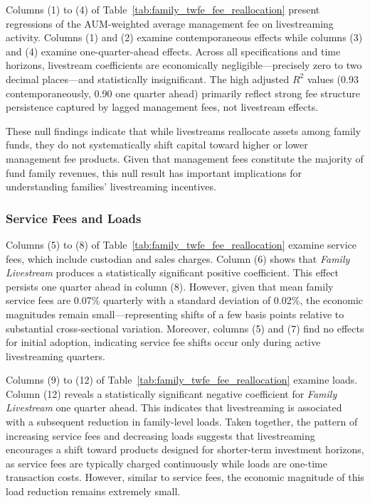 \documentclass[12pt]{article}
\begin{document}
Columns (1) to (4) of Table~\ref{tab:family_twfe_fee_reallocation} present regressions of the AUM-weighted average management fee on livestreaming activity. Columns (1) and (2) examine contemporaneous effects while columns (3) and (4) examine one-quarter-ahead effects. Across all specifications and time horizons, livestream coefficients are economically negligible—precisely zero to two decimal places—and statistically insignificant. The high adjusted $R^2$ values (0.93 contemporaneously, 0.90 one quarter ahead) primarily reflect strong fee structure persistence captured by lagged management fees, not livestream effects.

These null findings indicate that while livestreams reallocate assets among family funds, they do not systematically shift capital toward higher or lower management fee products. Given that management fees constitute the majority of fund family revenues, this null result has important implications for understanding families' livestreaming incentives.

\subsubsection{Service Fees and Loads}

Columns (5) to (8) of Table~\ref{tab:family_twfe_fee_reallocation} examine service fees, which include custodian and sales charges. Column (6) shows that \textit{Family Livestream} produces a statistically significant positive coefficient. This effect persists one quarter ahead in column (8). However, given that mean family service fees are 0.07\% quarterly with a standard deviation of 0.02\%, the economic magnitudes remain small—representing shifts of a few basis points relative to substantial cross-sectional variation. Moreover, columns (5) and (7) find no effects for initial adoption, indicating service fee shifts occur only during active livestreaming quarters.

Columns (9) to (12) of Table~\ref{tab:family_twfe_fee_reallocation} examine loads. Column (12) reveals a statistically significant negative coefficient for \textit{Family Livestream} one quarter ahead. This indicates that livestreaming is associated with a subsequent reduction in family-level loads. Taken together, the pattern of increasing service fees and decreasing loads suggests that livestreaming encourages a shift toward products designed for shorter-term investment horizons, as service fees are typically charged continuously while loads are one-time transaction costs. However, similar to service fees, the economic magnitude of this load reduction remains extremely small.
\end{document}
